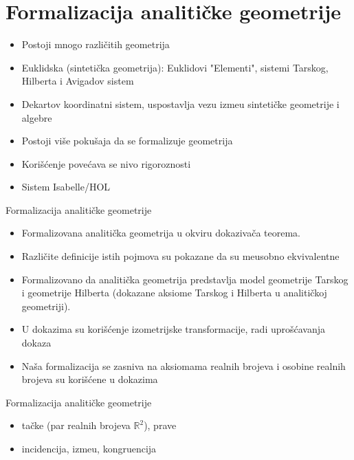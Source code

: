 \documentclass{beamer}
\def\d{{\fontencoding{T1}\selectfont\dj}}
\begin{document}
\section{Formalizacija analiti\v cke geometrije}

\begin{frame}
\begin{itemize}
\item Postoji mnogo razli\v citih geometrija
\item Euklidska (sinteti\v cka geometrija): Euklidovi "Elementi", sistemi Tarskog, Hilberta i Avigadov sistem
\item Dekartov koordinatni sistem, uspostavlja vezu izme\d u sinteti\v cke geometrije i algebre
\item Postoji vi\v se poku\v saja da se formalizuje geometrija
\item Kori\v s\'cenje  pove\'cava se nivo rigoroznosti
\item Sistem Isabelle/HOL
\end{itemize}
\end{frame}

\begin{frame}{Formalizacija analiti\v cke geometrije}
\begin{itemize}
\item Formalizovana analiti\v cka geometrija u okviru dokaziva\v ca teorema.
\item Razli\v cite definicije istih pojmova su pokazane da su me\d usobno ekvivalentne
\item Formalizovano da analiti\v cka geometrija predstavlja model geometrije Tarskog i geometrije Hilberta (dokazane aksiome
      Tarskog i Hilberta u analiti\v ckoj geometriji).
\item U dokazima su kori\v s\'cenje izometrijske transformacije, radi upro\v s\'cavanja dokaza
\item Na\v sa formalizacija se zasniva na aksiomama realnih brojeva i osobine realnih brojeva su kori\v s\'cene 
u dokazima
\end{itemize}
\end{frame}


\begin{frame}{Formalizacija analiti\v cke geometrije}
\begin{itemize}[<+->]
\item {} ta\v cke (par realnih brojeva $\mathbb{R}^2$), prave
\item {} incidencija, izme\d u, kongruencija
\end{itemize}
\end{frame}
\end{document}
